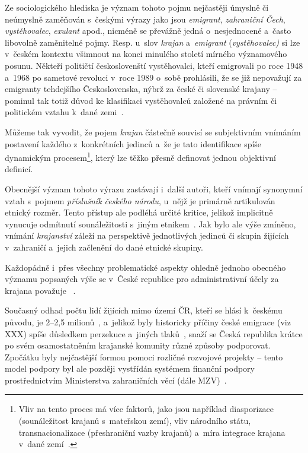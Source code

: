 Ze sociologického hlediska je význam tohoto pojmu nejčastěji úmyslně či neúmyslně zaměňován s~českými výrazy jako jsou \emph{emigrant}, \emph{zahraniční Čech}, \emph{vystěhovalec}, \emph{exulant} apod., nicméně se převážně jedná o~nesjednocené a~často libovolně zaměnitelné pojmy. Resp. u~slov \emph{krajan} a~\emph{emigrant} (\emph{vystěhovalec)} si lze v~českém kontextu všimnout na konci minulého století mírného významového posunu. Někteří političtí českoslovenští vystěhovalci, kteří emigrovali po roce 1948 a~1968 po sametové revoluci v~roce 1989 o~sobě prohlásili, že se již nepovažují za emigranty tehdejšího Československa, nýbrž za české či slovenské krajany -- pominul tak totiž důvod ke klasifikaci vystěhovalců založené na právním či politickém vztahu k~dané zemi~\parencite{Broucek2017}.

Můžeme tak vyvodit, že pojem \emph{krajan} částečně souvisí se subjektivním vnímáním postavení každého z~konkrétních jedinců a~že je tato identifikace spíše dynamickým procesem\footnote{Vliv na tento proces má více faktorů, jako jsou například diasporizace (sounáležitost krajanů s~mateřskou zemí), vliv národního státu, transnacionalizace (přeshraniční vazby krajanů) a~míra integrace krajana v~dané zemí~\parencite{Broucek2017}.}, který lze těžko přesně definovat jednou objektivní definicí.

Obecnější význam tohoto výrazu zastávají i~další autoři, kteří vnímají synonymní vztah s~pojmem \emph{příslušník českého národu}, u~nějž je primárně artikulován etnický rozměr. Tento přístup ale podléhá určité kritice, jelikož implicitně vynucuje odmítnutí sounáležitosti s~jiným etnikem~\parencite{Jakoubek2015}. Jak bylo ale výše zmíněno, vnímání \emph{krajanství} záleží na perspektivě jednotlivých jedinců či skupin žijících v~zahraničí a~jejich začlenění do dané etnické skupiny.

Každopádně i~přes všechny problematické aspekty ohledně jednoho obecného významu popsaných výše se v~České republice pro administrativní účely za krajana považuje ~\parencite{Krajane-mv1}.

Současný odhad počtu lidí žijících mimo území ČR, kteří se hlásí k~českému původu, je 2--2,5 milionů~\parencite{Krajane-mv2}, a~jelikož byly historicky příčiny české emigrace (viz XXX) spíše důsledkem perzekuce a~jiných tlaků~\parencite{Vaculik2009a}, snaží se Česká republika krátce po svém osamostatněním krajanské komunity různé způsoby podporovat. Zpočátku byly nejčastější formou pomoci rozličné rozvojové projekty -- tento model podpory byl ale později vystřídán systémem finanční podpory prostřednictvím Ministerstva zahraničních věcí (dále MZV)~\parencite{Broucek2009}.

